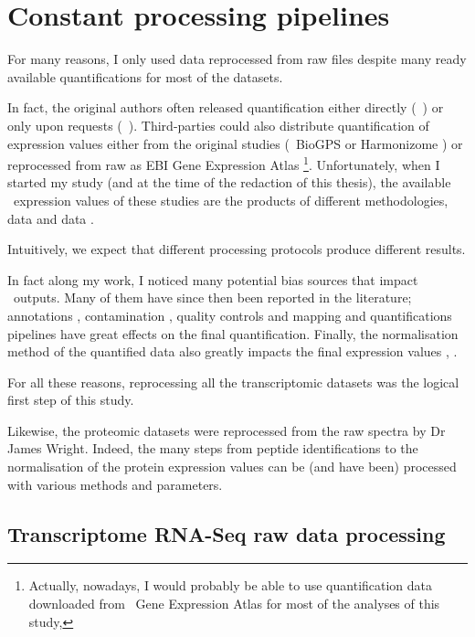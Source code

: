 \section{Constant processing pipelines}

For many reasons, I only used data reprocessed from raw files despite many
ready available quantifications for most of the datasets.

In fact, the original authors often released
quantification either directly (\eg\ \cite{Krupp2012})
or only upon requests (\eg\ \cite{PandeyData}).
Third-parties could also distribute quantification of expression values either
from the original studies (\eg\ BioGPS \citep{BioGPS1} or
Harmonizome \citep{Harmonizome}) or
reprocessed from raw as EBI Gene Expression Atlas \citep{EBIgxa}\footnote{Actually,
nowadays, I would probably be able to use quantification data downloaded
from \EBI\ Gene Expression Atlas for most of the analyses of this study,}.
Unfortunately, when I started my study (and at the time of the redaction
of this thesis), the available \Rnaseq\ expression values of these studies
are the products of different methodologies, \eg\ \dataset{\Gtex}
data \citep{GTExTranscript} and  data \citep{Krupp2012}.

Intuitively, we expect that different processing protocols produce
different results.

In fact along my work, I noticed many potential bias sources that impact
\Rnaseq\ outputs. Many of them have since then been reported in the literature;
annotations \citep{annotationDiff},
contamination \citep{contaminationRNAseq},
quality controls \citep{qualityRNAseq} and
mapping and quantifications pipelines \citep{Fonseca2014}
have great effects on the final quantification. Finally, the normalisation
method of the quantified data also greatly impacts the final expression values
\citep{Dillies2013}, \citep{normalisation2}.

For all these reasons, reprocessing all the transcriptomic datasets was the
logical first step of this study.

Likewise, the proteomic datasets were reprocessed from the raw spectra by Dr
James Wright. Indeed, the many steps from peptide identifications to the
normalisation of the protein expression values can be (and have been) processed
with various methods and parameters.


\subsection{Transcriptome RNA-Seq raw data processing}

